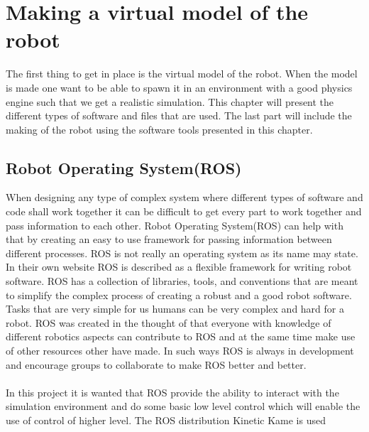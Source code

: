 \chapter{Making a virtual model of the robot}
The first thing to get in place is the virtual model of the robot. When the model is made one want to be able to spawn it in an environment with a good physics engine such that we get a realistic simulation. This chapter will present the different types of software and files that are used. The last part will include the making of the robot using the software tools presented in this chapter. 




\section{Robot Operating System(ROS)}
When designing any type of complex system where different types of software and code shall work together it can be difficult to get every part to work together and pass information to each other. Robot Operating System(ROS) can help with that by creating an easy to use framework for passing information between different processes\cite{ROS}. ROS is not really an operating system as its name may state. In their own website\cite{ROS} ROS is described as a flexible framework for writing robot software. ROS has a collection of libraries, tools, and conventions that are meant to simplify the complex process of creating a robust and a good robot software. Tasks that are very simple for us humans can be very complex and hard for a robot. ROS was created in the thought of that everyone with knowledge of different robotics aspects can contribute to ROS and at the same time make use of other resources other have made. In such ways ROS is always in development and encourage groups to collaborate to make ROS better and better. \\\\
In this project it is wanted that ROS provide the ability to interact with the simulation environment and do some basic low level control which will enable the use of control of higher level. The ROS distribution Kinetic Kame is used\cite{ROS}


